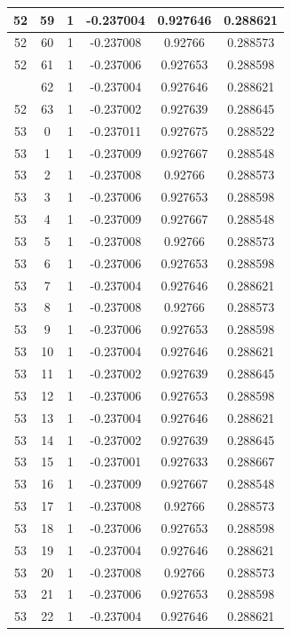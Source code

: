 \documentclass[12pt,a4paper]{article}
\numberwithin{equation}{section}
\numberwithin{figure}{section}
\numberwithin{table}{section}
\begin{document}
\begin{longtable}{|c|c|c|c|c|c|}
52 & 59 & 1 & -0.237004 & 0.927646 & 0.288621 \\ \hline
52 & 60 & 1 & -0.237008 & 0.92766 & 0.288573 \\ \hline
52 & 61 & 1 & -0.237006 & 0.927653 & 0.288598 \\ \hline
\pagebreak
52 & 62 & 1 & -0.237004 & 0.927646 & 0.288621 \\ \hline
52 & 63 & 1 & -0.237002 & 0.927639 & 0.288645 \\ \hline
53 & 0 & 1 & -0.237011 & 0.927675 & 0.288522 \\ \hline
53 & 1 & 1 & -0.237009 & 0.927667 & 0.288548 \\ \hline
53 & 2 & 1 & -0.237008 & 0.92766 & 0.288573 \\ \hline
53 & 3 & 1 & -0.237006 & 0.927653 & 0.288598 \\ \hline
53 & 4 & 1 & -0.237009 & 0.927667 & 0.288548 \\ \hline
53 & 5 & 1 & -0.237008 & 0.92766 & 0.288573 \\ \hline
53 & 6 & 1 & -0.237006 & 0.927653 & 0.288598 \\ \hline
53 & 7 & 1 & -0.237004 & 0.927646 & 0.288621 \\ \hline
53 & 8 & 1 & -0.237008 & 0.92766 & 0.288573 \\ \hline
53 & 9 & 1 & -0.237006 & 0.927653 & 0.288598 \\ \hline
53 & 10 & 1 & -0.237004 & 0.927646 & 0.288621 \\ \hline
53 & 11 & 1 & -0.237002 & 0.927639 & 0.288645 \\ \hline
53 & 12 & 1 & -0.237006 & 0.927653 & 0.288598 \\ \hline
53 & 13 & 1 & -0.237004 & 0.927646 & 0.288621 \\ \hline
53 & 14 & 1 & -0.237002 & 0.927639 & 0.288645 \\ \hline
53 & 15 & 1 & -0.237001 & 0.927633 & 0.288667 \\ \hline
53 & 16 & 1 & -0.237009 & 0.927667 & 0.288548 \\ \hline
53 & 17 & 1 & -0.237008 & 0.92766 & 0.288573 \\ \hline
53 & 18 & 1 & -0.237006 & 0.927653 & 0.288598 \\ \hline
53 & 19 & 1 & -0.237004 & 0.927646 & 0.288621 \\ \hline
53 & 20 & 1 & -0.237008 & 0.92766 & 0.288573 \\ \hline
53 & 21 & 1 & -0.237006 & 0.927653 & 0.288598 \\ \hline
53 & 22 & 1 & -0.237004 & 0.927646 & 0.288621 \\ \hline

\end{longtable}
\end{document}
